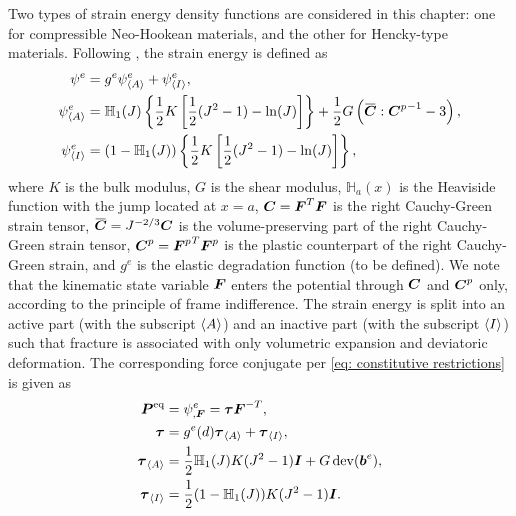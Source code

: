 Two types of strain energy density functions are considered in this chapter: one for compressible Neo-Hookean materials, and the other for Hencky-type materials.
Following \cite{borden2016phase,ambati2016phase}, the strain energy is defined as
\begin{subequations}
  \begin{align}
    \psi^e               & =  g^e \psi^e_\activepart + \psi^e_\inactivepart,                                                                                                          \\
    \psi^e_\activepart   & = \mathbb{H}_1(J)\left\{ \dfrac{1}{2}K\left[ \dfrac{1}{2}(J^2-1) - \ln(J) \right] \right\} + \dfrac{1}{2}G\left( \overbar{\bfC}:{\bfC^p}^{-1} - 3 \right), \\
    \psi^e_\inactivepart & = \left( 1-\mathbb{H}_1(J) \right) \left\{ \dfrac{1}{2}K\left[ \dfrac{1}{2}(J^2-1) - \ln(J) \right] \right\},                                              
  \end{align}
\end{subequations}
where $K$ is the bulk modulus, $G$ is the shear modulus, $\mathbb{H}_a(x)$ is the Heaviside function with the jump located at $x = a$, $\boldsymbol{C} = \boldsymbol{F}^T \boldsymbol{F}$ is the right Cauchy-Green strain tensor, $\overbar{\bfC} = J^{-2/3}\bfC$ is the volume-preserving part of the right Cauchy-Green strain tensor, $\boldsymbol{C}^p = {\boldsymbol{F}^p}^T \boldsymbol{F}^p$ is the plastic counterpart of the right Cauchy-Green strain, and $g^e$ is the elastic degradation function (to be defined). We note that the kinematic state variable $\boldsymbol{F}$ enters the potential through $\boldsymbol{C}$ and $\boldsymbol{C}^p$ only, according to the principle of frame indifference.
The strain energy is split into an active part (with the subscript ${\left< A \right>}$) and an inactive part (with the subscript ${\left< I \right>}$) such that fracture is associated with only volumetric expansion and deviatoric deformation. The corresponding force conjugate per \eqref{eq: constitutive restrictions} is given as
\begin{subequations}
  \begin{align}
    \boldsymbol{P}^\text{eq}          & = \psi^e_{, \boldsymbol{F}} = \boldsymbol{\tau}\boldsymbol{F}^{-T},                \\
    \boldsymbol{\tau}               & = g^e(d)\boldsymbol{\tau}_{\left< A \right>} + \boldsymbol{\tau}_{\left< I \right>},       \\
    \boldsymbol{\tau}_{\left< A \right>}   & = \dfrac{1}{2}\mathbb{H}_1(J)K(J^2-1)\boldsymbol{I} + G\operatorname{dev}(\boldsymbol{b}^e), \\
    \boldsymbol{\tau}_{\left< I \right>} & = \dfrac{1}{2}(1-\mathbb{H}_1(J))K(J^2-1)\boldsymbol{I}.               
  \end{align}
\end{subequations}

